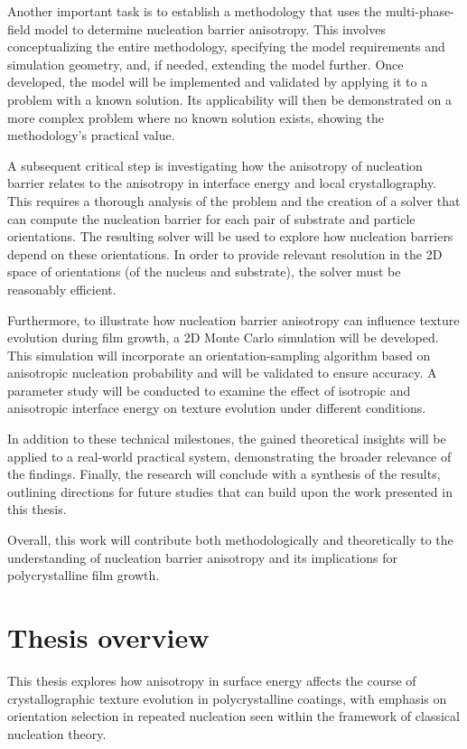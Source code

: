 Another important task is to establish a methodology that uses the multi-phase-field model to determine nucleation barrier anisotropy. This involves conceptualizing the entire methodology, specifying the model requirements and simulation geometry, and, if needed, extending the model further. Once developed, the model will be implemented and validated by applying it to a problem with a known solution. Its applicability will then be demonstrated on a more complex problem where no known solution exists, showing the methodology’s practical value.

A subsequent critical step is investigating how the anisotropy of nucleation barrier relates to the anisotropy in interface energy and local crystallography. This requires a thorough analysis of the problem and the creation of a solver that can compute the nucleation barrier for each pair of substrate and particle orientations. The resulting solver will be used to explore how nucleation barriers depend on these orientations. In order to provide relevant resolution in the 2D space of orientations (of the nucleus and substrate), the solver must be reasonably efficient.

Furthermore, to illustrate how nucleation barrier anisotropy can influence texture evolution during film growth, a 2D Monte Carlo simulation will be developed. This simulation will incorporate an orientation-sampling algorithm based on anisotropic nucleation probability and will be validated to ensure accuracy. A parameter study will be conducted to examine the effect of isotropic and anisotropic interface energy on texture evolution under different conditions.

In addition to these technical milestones, the gained theoretical insights will be applied to a real-world practical system, demonstrating the broader relevance of the findings. Finally, the research will conclude with a synthesis of the results, outlining directions for future studies that can build upon the work presented in this thesis.

Overall, this work will contribute both methodologically and theoretically to the understanding of nucleation barrier anisotropy and its implications for polycrystalline film growth. 


\section{Thesis overview} \label{sec_Thesis_overview}
This thesis explores how anisotropy in surface energy affects the course of crystallographic texture evolution in polycrystalline coatings, with emphasis on orientation selection in repeated nucleation seen within the framework of classical nucleation theory. 

